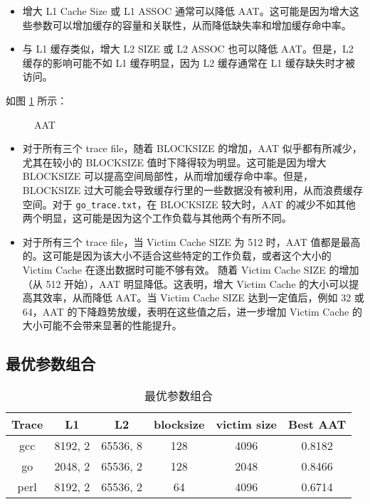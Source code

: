 \begin{itemize}
    \item 增大 L1 Cache Size 或 L1 ASSOC 通常可以降低 AAT。这可能是因为增大这些参数可以增加缓存的容量和关联性，从而降低缺失率和增加缓存命中率。
    \item 与 L1 缓存类似，增大 L2 SIZE 或 L2 ASSOC 也可以降低 AAT。但是，L2 缓存的影响可能不如 L1 缓存明显，因为 L2 缓存通常在 L1 缓存缺失时才被访问。
\end{itemize}

如图 \ref{fig:aatBs} 所示：

\begin{figure}[!htbp]
    \centering
    \caption{AAT}\label{fig:aatBs}
\end{figure}


\begin{itemize}
    \item 对于所有三个 trace file，随着 BLOCKSIZE 的增加，AAT 似乎都有所减少，尤其在较小的 BLOCKSIZE 值时下降得较为明显。这可能是因为增大 BLOCKSIZE 可以提高空间局部性，从而增加缓存命中率。但是，BLOCKSIZE 过大可能会导致缓存行里的一些数据没有被利用，从而浪费缓存空间。对于 \verb|go_trace.txt|，在 BLOCKSIZE 较大时，AAT 的减少不如其他两个明显，这可能是因为这个工作负载与其他两个有所不同。
    \item 对于所有三个 trace file，当 Victim Cache SIZE 为 512 时，AAT 值都是最高的。这可能是因为该大小不适合这些特定的工作负载，或者这个大小的 Victim Cache 在逐出数据时可能不够有效。
        随着 Victim Cache SIZE 的增加（从 512 开始），AAT 明显降低。这表明，增大 Victim Cache 的大小可以提高其效率，从而降低 AAT。当 Victim Cache SIZE 达到一定值后，例如 32 或 64，AAT 的下降趋势放缓，表明在这些值之后，进一步增加 Victim Cache 的大小可能不会带来显著的性能提升。
\end{itemize}

\subsection{最优参数组合}

\begin{table}[!htbp]
    \centering
    \caption{最优参数组合}\label{tab:res2}
    \begin{tabular}{cccccc}
        \hline
        Trace & L1 & L2 & blocksize & victim size & Best AAT \\
        \hline
        gcc & 8192, 2 & 65536, 8 & 128 & 4096 & 0.8182 \\
        go & 2048, 2 & 65536, 2 & 128 & 2048 & 0.8466 \\
        perl & 8192, 2 & 65536, 2 & 64 & 4096 & 0.6714 \\
        \hline
    \end{tabular}
\end{table}
